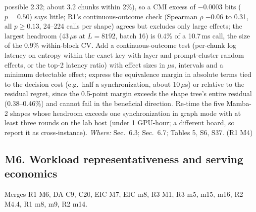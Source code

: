 \documentclass[11pt]{article}
\begin{document}
\begin{enumerate}[label=M5\alph*.]
        possible 2.32; about 3.2 chunks within 2\%), so a CMI excess of
        $-0.0003$ bits ($p=0.50$) says little; R1's continuous-outcome check
        (Spearman $\rho$ $-0.06$ to 0.31, all $p\ge0.13$, 24--224 calls per
        shape) agrees but excludes only large effects; the largest headroom
        (43\,$\mu$s at $L=8192$, batch 16) is 0.4\% of a 10.7\,ms call, the
        size of the 0.9\% within-block CV. Add a continuous-outcome test
        (per-chunk log latency on entropy within the exact key with layer and
        prompt-cluster random effects, or the top-2 latency ratio) with effect
        sizes in $\mu$s, intervals and a minimum detectable effect; express
        the equivalence margin in absolute terms tied to the decision cost
        (e.g.\ half a synchronization, about 10\,$\mu$s) or relative to the
        residual regret, since the 0.5-point margin exceeds the shape tree's
        entire residual (0.38--0.46\%) and cannot fail in the beneficial
        direction. Re-time the five Mamba-2 shapes whose headroom exceeds one
        synchronization in graph mode with at least three rounds on the lab
        host (under 1 GPU-hour; a different board, so report it as
        cross-instance). \emph{Where:} Sec.~6.3; Sec.~6.7; Tables 5, S6, S37.
        (R1 M4)
\end{enumerate}

\subsection*{M6. Workload representativeness and serving economics}
Merges R1 M6, DA C9, C20, EIC M7, EIC m8, R3 M1, R3 m5, m15, m16, R2 M4.4, R1
m8, m9, R2 m14.
\end{document}
